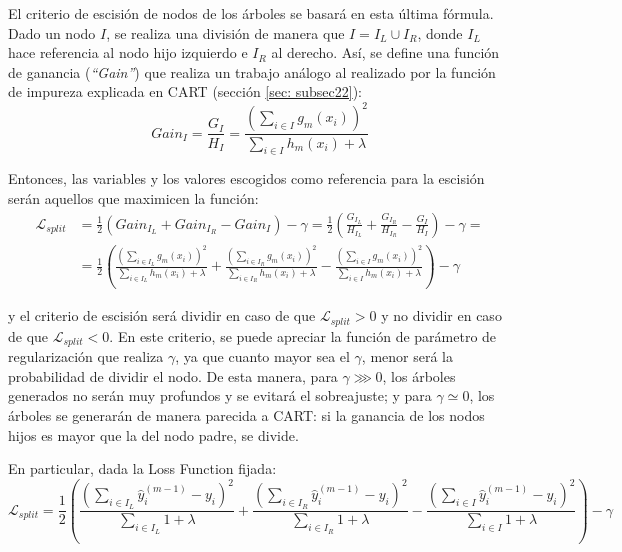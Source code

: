 \documentclass[12pt,twoside]{article}
\begin{document}
El criterio de escisión de nodos de los árboles se basará en esta última fórmula. Dado un nodo $I$, se realiza una división de manera que $I = I_L \cup I_R$, donde $I_L$ hace referencia al nodo hijo izquierdo e $I_R$ al derecho. Así, se define una función de ganancia (\textit{``Gain''}) que realiza un trabajo análogo al realizado por la función de impureza explicada en CART (sección \ref{sec: subsec22}):
\begin{equation*}
Gain_I = \frac{G_I}{H_I} = \frac{\left( \sum_{i \in I} g_m(x_i) \right)^2}{\sum_{i \in I} h_m(x_i) + \lambda}
\end{equation*}

Entonces, las variables y los valores escogidos como referencia para la escisión serán aquellos que maximicen la función:
\begin{equation*}
\begin{split}
\mathcal{L}_{split} &= \frac{1}{2} \left( Gain_{I_L} + Gain_{I_R} - Gain_{I} \right) - \gamma = \frac{1}{2} \left( \frac{G_{I_L}}{H_{I_L}} + \frac{G_{I_R}}{H_{I_R}} - \frac{G_I}{H_I} \right) - \gamma = \\
&= \frac{1}{2} \left( \frac{\left( \sum_{i \in I_L} g_m(x_i) \right)^2}{\sum_{i \in I_L} h_m(x_i) + \lambda} + \frac{\left( \sum_{i \in I_R} g_m(x_i) \right)^2}{\sum_{i \in I_R} h_m(x_i) + \lambda} - \frac{\left( \sum_{i \in I} g_m(x_i) \right)^2}{\sum_{i \in I} h_m(x_i) + \lambda} \right)   - \gamma
\end{split}
\end{equation*}

\noindent
y el criterio de escisión será dividir en caso de que $\mathcal{L}_{split} > 0$ y no dividir en caso de que $\mathcal{L}_{split} < 0$. En este criterio, se puede apreciar la función de parámetro de regularización que realiza $\gamma$, ya que cuanto mayor sea el $\gamma$, menor será la probabilidad de dividir el nodo. De esta manera, para $\gamma \ggg 0$, los árboles generados no serán muy profundos y se evitará el sobreajuste; y para $\gamma \simeq 0$, los árboles se generarán de manera parecida a CART: si la ganancia de los nodos hijos es mayor que la del nodo padre, se divide.

En particular, dada la Loss Function fijada:
\begin{equation*}
\mathcal{L}_{split} = \frac{1}{2} \left( \frac{\left( \sum_{i \in I_L} \hat{y}_i^{(m-1)} - y_i \right)^2}{\sum_{i \in I_L} 1 + \lambda} + \frac{\left( \sum_{i \in I_R} \hat{y}_i^{(m-1)} - y_i \right)^2}{\sum_{i \in I_R} 1 + \lambda} - \frac{\left( \sum_{i \in I} \hat{y}_i^{(m-1)} - y_i \right)^2}{\sum_{i \in I} 1 + \lambda} \right)   - \gamma
\end{equation*}
\end{document}
